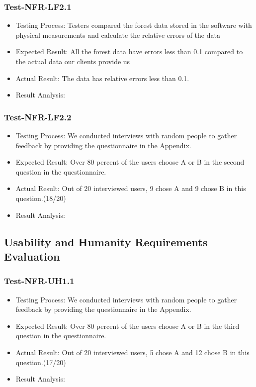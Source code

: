 \documentclass[12pt, titlepage]{article}
\begin{document}
            \subsubsection{Test-NFR-LF2.1}
\begin{itemize}
    \item Testing Process: Testers compared the forest data stored in the software with physical measurements and calculate the relative errors of the data
    \item Expected Result: All the forest data have errors less than 0.1 compared to the actual data our clients provide us
    \item Actual Result: The data has relative errors less than 0.1.
    \item Result Analysis: \pass
\end{itemize}
            \subsubsection{Test-NFR-LF2.2}
\begin{itemize}
    \item Testing Process: We conducted interviews with random people to gather feedback by providing the questionnaire in the Appendix.
    \item Expected Result: Over 80 percent of the users choose A or B in the second question in the questionnaire.
    \item Actual Result: Out of 20 interviewed users, 9 chose A and 9 chose B in this question.(18/20)
    \item Result Analysis: \pass
\end{itemize}
\subsection{Usability and Humanity Requirements Evaluation}
            \subsubsection{Test-NFR-UH1.1}
\begin{itemize}
    \item Testing Process: We conducted interviews with random people to gather feedback by providing the questionnaire in the Appendix.
    \item Expected Result: Over 80 percent of the users choose A or B in the third question in the questionnaire.
    \item Actual Result: Out of 20 interviewed users, 5 chose A and 12 chose B in this question.(17/20)
    \item Result Analysis: \pass
\end{itemize}
\end{document}
